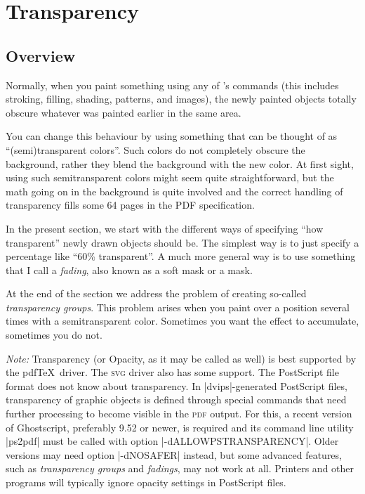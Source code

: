 %
%
%


\section{Transparency}
\label{section-tikz-transparency}

\subsection{Overview}

Normally, when you paint something using any of \tikzname's commands (this
includes stroking, filling, shading, patterns, and images), the newly painted
objects totally obscure whatever was painted earlier in the same area.

You can change this behaviour by using something that can be thought of as
``(semi)transparent colors''. Such colors do not completely obscure the
background, rather they blend the background with the new color. At first
sight, using such semitransparent colors might seem quite straightforward, but
the math going on in the background is quite involved and the correct handling
of transparency fills some 64 pages in the PDF specification.

In the present section, we start with the different ways of specifying ``how
transparent'' newly drawn objects should be. The simplest way is to just
specify a percentage like ``60\% transparent''. A much more general way is to
use something that I call a \emph{fading}, also known as a soft mask or a mask.

At the end of the section we address the problem of creating so-called
\emph{transparency groups}. This problem arises when you paint over a position
several times with a semitransparent color. Sometimes you want the effect to
accumulate, sometimes you do not.

\emph{Note:} Transparency (or Opacity, as it may be called as well) is best
supported by the pdf\TeX\ driver. The \textsc{svg} driver also has some
support. The PostScript file format does not know about transparency. In
|dvips|-generated PostScript files, transparency of graphic objects is defined
through special commands that need further processing to become visible in the
\textsc{pdf} output. For this, a recent version of Ghostscript, preferably 9.52
or newer, is required and its command line utility |ps2pdf| must be called with
option |-dALLOWPSTRANSPARENCY|. Older versions may need option |-dNOSAFER|
instead, but some advanced features, such as \emph{transparency groups} and
\emph{fadings}, may not work at all. Printers and other programs will typically
ignore opacity settings in PostScript files.


